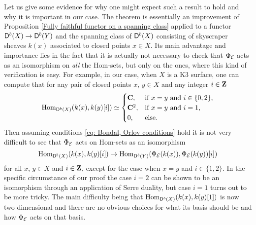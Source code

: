 Let us give some evidence for why one might expect such a result to hold and why it is important in our case. The theorem is essentially an improvement of Proposition \ref{Fully faithful functor on a spanning class} applied to a functor $\mathsf{D}^b(X) \to \mathsf{D}^b(Y)$ and the spanning class of $\mathsf{D}^b(X)$ consisting of skyscraper sheaves $k(x)$ associated to closed points $x \in X$. Its main advantage and importance lies in the fact that it is actually not necessary 
to check that $\Phi_{\mathcal E}$ acts as an isomorphism on \emph{all} the Hom-sets, but only on the ones, where this kind of verification is easy. For example, in our case, when $X$ is a K3 surface, one can compute that 
for any pair of closed points $x$, $y \in X$ and any integer $i \in \mathbf Z$
\begin{equation}
        \mathrm{Hom}_{\mathsf{D}^b(X)}(k(x), k(y)[i]) \simeq \begin{cases}
            \mathbf C, &\text{if $x = y$ and $i \in \{0, 2\}$,} \\
            \mathbf C^2, &\text{if $x = y$ and $i = 1$,} \\
            0, &\text{else.}
        \end{cases}
\end{equation}
Then assuming conditions \eqref{eq: Bondal, Orlov conditions} hold it is not very difficult to see that $\Phi_{\mathcal E}$ acts on Hom-sets as an isomorphism
\[
    \mathrm{Hom}_{\mathsf{D}^b(X)}(k(x), k(y)[i]) \to  \mathrm{Hom}_{\mathsf{D}^b(Y)}(\Phi_{\mathcal E}(k(x)), \Phi_{\mathcal E}(k(y))[i])
\] 
for all $x$, $y \in X$ and $i \in \mathbf Z$, except for the case when $x = y$ and $i \in \{1,2\}$. In the specific circumstance of our proof the case $i = 2$ can be shown to be an isomorphism through an application of Serre duality, but case $i = 1$ turns out to be more tricky. The main difficulty being that $\mathrm{Hom}_{\mathsf{D}^b(X)}(k(x), k(y)[1])$ is now two dimensional and there are no obvious choices for what its basis should be and how $\Phi_{\mathcal E}$ acts on that basis. 



